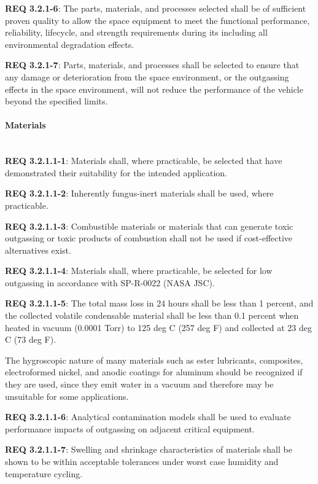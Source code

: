 \documentclass[12pt]{article}
\begin{document}
\noindent \textbf{REQ 3.2.1-6}: The parts, materials, and processes selected shall be of sufficient proven quality to allow the space equipment to meet the functional performance, reliability, lifecycle, and strength requirements during its including all environmental degradation effects.

\noindent \textbf{REQ 3.2.1-7}: Parts, materials, and processes shall be selected to ensure that any damage or deterioration from the space environment, or the outgassing effects in the space environment, will not reduce the performance of the vehicle beyond the specified limits.


\paragraph{Materials} \mbox{} \\ %
\noindent \textbf{REQ 3.2.1.1-1}: Materials shall, where practicable, be selected that have demonstrated their suitability for the intended application. 

\noindent \textbf{REQ 3.2.1.1-2}: Inherently fungus-inert materials shall be used, where practicable. 

\noindent \textbf{REQ 3.2.1.1-3}: Combustible materials or materials that can generate toxic outgassing or toxic products of combustion shall not be used if cost-effective alternatives exist.

\noindent \textbf{REQ 3.2.1.1-4}: Materials shall, where practicable, be selected for low outgassing in accordance with SP-R-0022 (NASA JSC). 

\noindent \textbf{REQ 3.2.1.1-5}: The total mass loss in 24 hours shall be less than 1 percent, and the collected volatile condensable material shall be less than 0.1 percent when heated in vacuum (0.0001 Torr) to 125 deg C (257 deg F) and collected at 23 deg C (73 deg F). 

The hygroscopic nature of many materials such as ester lubricants, composites, electroformed nickel, and anodic coatings for aluminum should be recognized if they are used, since they emit water in a vacuum and therefore may be unsuitable for some applications.

\noindent \textbf{REQ 3.2.1.1-6}: Analytical contamination models shall be used to evaluate performance impacts of outgassing on adjacent critical equipment. 

\noindent \textbf{REQ 3.2.1.1-7}: Swelling and shrinkage characteristics of materials shall be shown to be within acceptable tolerances under worst case humidity and temperature cycling.
\end{document}
